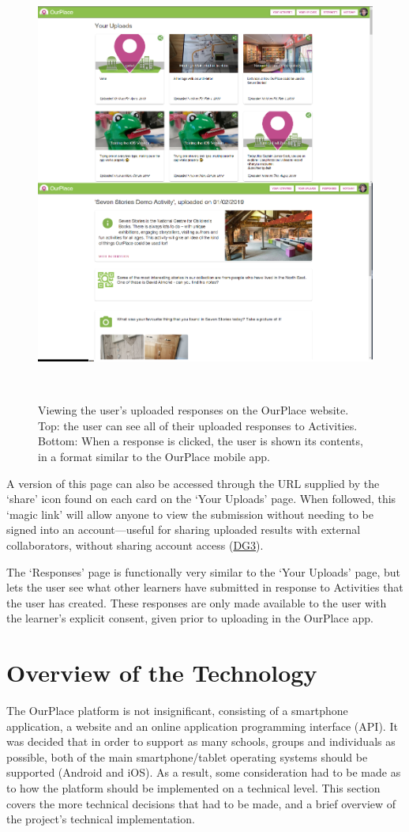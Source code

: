 \begin{figure}
  \centering
  \includegraphics[width=0.85\columnwidth]{images/chapter05/webResults.png}
  \caption[The OurPlace website: the user's responses]{Viewing the user's uploaded responses on the OurPlace website. Top: the user can see all of their uploaded responses to Activities. Bottom: When a response is clicked, the user is shown its contents, in a format similar to the OurPlace mobile app.}~\label{fig:websiteResults}
\end{figure}

A version of this page can also be accessed through the URL supplied by the `share' icon found on each card on the `Your Uploads' page. When followed, this `magic link' will allow anyone to view the submission without needing to be signed into an account---useful for sharing uploaded results with external collaborators, without sharing account access (\hyperref[DG3]{DG3}).

The `Responses' page is functionally very similar to the `Your Uploads' page, but lets the user see what other learners have submitted in response to Activities that the user has created. These responses are only made available to the user with the learner's explicit consent, given prior to uploading in the OurPlace app.

\section{Overview of the Technology}
The OurPlace platform is not insignificant, consisting of a smartphone application, a website and an online application programming interface (API). It was decided that in order to support as many schools, groups and individuals as possible, both of the main smartphone/tablet operating systems should be supported (Android and iOS). As a result, some consideration had to be made as to how the platform should be implemented on a technical level. This section covers the more technical decisions that had to be made, and a brief overview of the project's technical implementation.

